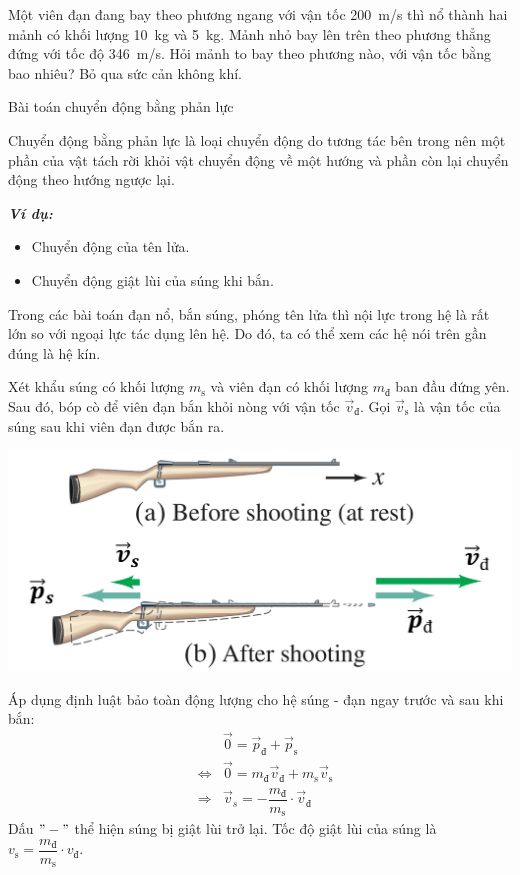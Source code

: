 \begin{vd}
	Một viên đạn đang bay theo phương ngang với vận tốc \SI{200}{\meter/\second} thì nổ thành hai mảnh có khối lượng \SI{10}{\kilogram} và \SI{5}{\kilogram}. Mảnh  nhỏ bay lên trên theo phương thẳng đứng với tốc độ \SI{346}{\meter/\second}. Hỏi mảnh to bay theo phương nào, với vận tốc bằng bao nhiêu? Bỏ qua sức cản không khí.
\end{vd}
\begin{dang}{Bài toán chuyển động bằng phản lực}
	\begin{dn}
		Chuyển động bằng phản lực là loại chuyển động do tương tác bên trong nên một phần của vật tách rời khỏi vật chuyển động về một hướng và phần còn lại chuyển động theo hướng ngược lại.
	\end{dn}
	\textbf{\textit{Ví dụ:}}
	\begin{itemize}
		\item Chuyển động của tên lửa.
		\item Chuyển động giật lùi của súng khi bắn.
	\end{itemize}
	\begin{note}
		Trong các bài toán đạn nổ, bắn súng, phóng tên lửa thì nội lực trong hệ là rất lớn so với ngoại lực tác dụng lên hệ. Do đó, ta có thể xem các hệ nói trên gần đúng là hệ kín.
	\end{note}
	Xét khẩu súng có khối lượng $m_\mathrm{s}$ và viên đạn có khối lượng $m_{\text{đ}}$ ban đầu đứng yên. Sau đó, bóp cò để viên đạn bắn khỏi nòng với vận tốc $\vec{v}_{\text{đ}}$. Gọi $\vec{v}_{\mathrm{s}}$ là vận tốc của súng sau khi viên đạn được bắn ra.
	\begin{center}
		\includegraphics[scale=0.25]{figs/DONGLUONG-3}
	\end{center}
	Áp dụng định luật bảo toàn động lượng cho hệ súng - đạn ngay trước và sau khi bắn:
	\begin{eqnarray*}
		&&\vec{0}=\vec{p}_{\text{đ}}+\vec{p}_{\mathrm{s}}\\
		&\Leftrightarrow& \vec{0}=m_{\text{đ}}\vec{v}_{\text{đ}}+m_{\text{s}}\vec{v}_{\text{s}}\\
		&\Rightarrow& \vec{v}_{s}=-\dfrac{m_{\text{đ}}}{m_{\text{s}}}\cdot\vec{v}_{\text{đ}}
	\end{eqnarray*}
Dấu $"-"$ thể hiện súng bị giật lùi trở lại. Tốc độ giật lùi của súng là $v_{\mathrm{s}}=\dfrac{m_{\text{đ}}}{m_{\text{s}}}\cdot v_{\text{đ}}$.
\end{dang}
